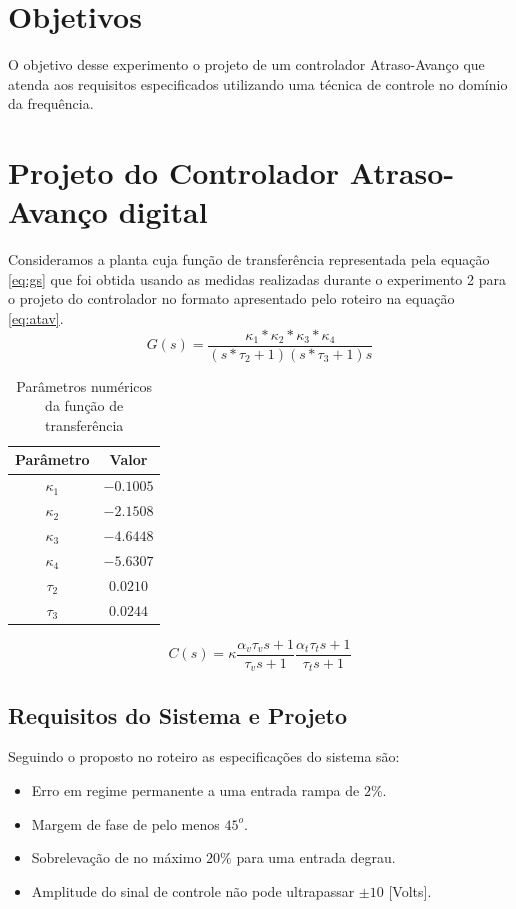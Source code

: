 \documentclass{article}
\begin{document}


\onehalfspacing
\section{Objetivos} 
O objetivo desse experimento o projeto de um controlador Atraso-Avanço que atenda aos requisitos especificados utilizando uma técnica de controle no domínio da frequência. 
	
\section{Projeto do Controlador Atraso-Avanço digital}
Consideramos a planta cuja função de transferência representada pela equação \ref{eq:gs} que foi obtida usando as medidas realizadas durante o experimento 2 \cite{bb:lab2} para o projeto do controlador no formato apresentado pelo roteiro \cite{bb:roteiro} na equação \ref{eq:atav}.\\

\begin{equation}
\label{eq:gs}
G(s) = \frac{\kappa_1*\kappa_2*\kappa_3*\kappa_4}{(s*\tau_2 + 1)(s*\tau_3 + 1)s}
\end{equation}

\begin{table}[H]
\centering
\caption{Parâmetros numéricos da função de transferência}
\label{tab:valores}
\begin{tabular}{|c|c|}
	\hline Parâmetro & Valor \\ 
	\hline $\kappa_1$ & $-0.1005$\\ 
	\hline $\kappa_2$ & $-2.1508$\\ 
	\hline $\kappa_3$ & $-4.6448$\\ 
	\hline $\kappa_4$ & $-5.6307$\\ 
	\hline $\tau_2$ & $0.0210$\\ 
	\hline $\tau_3$ & $0.0244$ \\ 	
	\hline 
\end{tabular} 
\end{table}

\begin{equation}
\label{eq:atav}
C(s)=\kappa \frac{\alpha_v \tau_v s + 1}{\tau_v s + 1} \frac{\alpha_t \tau_t s + 1}{\tau_t s + 1}
\end{equation}

\subsection{Requisitos do Sistema e Projeto}
Seguindo o proposto no roteiro \cite{bb:roteiro} as especificações do sistema são:
\begin{itemize}
	\item Erro em regime permanente a uma entrada rampa de $2\%$.
	\item Margem de fase de pelo menos $45^o$.
	\item Sobrelevação de no máximo $20\%$ para uma entrada degrau.
	\item Amplitude do sinal de controle não pode ultrapassar $\pm10$ [Volts].
\end{itemize}\
\end{document}
